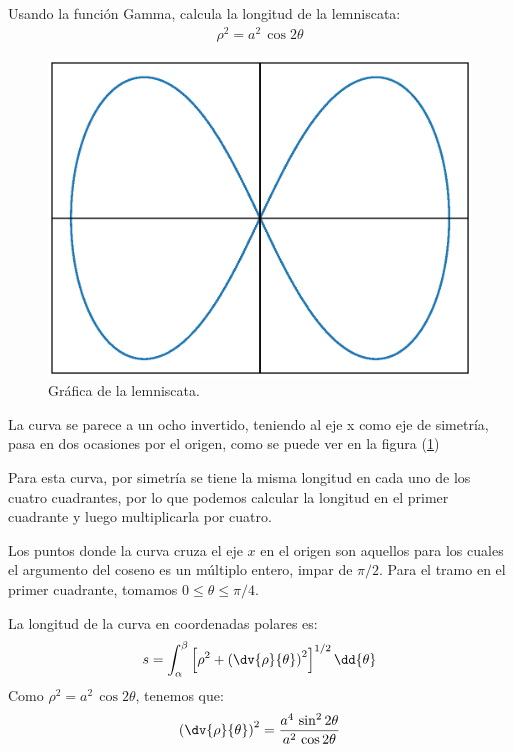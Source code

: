 Usando la función Gamma, calcula la longitud de la lemniscata:
\begin{align*}
\rho^{2} = a^{2} \, \cos 2 \theta
\end{align*}
\begin{figure}
    \centering
    \includegraphics[scale=0.54]{Imagenes/plot_leminscata_01.eps}
    \caption{Gráfica de la lemniscata.}
    \label{fig:figura_lemniscata}
\end{figure}
La curva se parece a un ocho invertido, teniendo al eje x como eje de simetría, pasa en dos ocasiones por el origen, como se puede ver en la figura (\ref{fig:figura_lemniscata})
\par
Para esta curva, por simetría se tiene la misma longitud en cada uno de los cuatro cuadrantes, por lo que podemos calcular la longitud en el primer cuadrante y luego multiplicarla por cuatro.
\par
Los puntos donde la curva cruza el eje $x$ en el origen son aquellos para los cuales el argumento del coseno es un múltiplo entero, impar de $\pi / 2$.  Para el tramo en el primer cuadrante, tomamos $0 \leq \theta \leq \pi/4$.
\par
La longitud de la curva en coordenadas polares es:
\begin{align*}
s = \int_{\alpha}^{\beta} \left[ \rho^{2} + \left( \dv{\rho}{\theta} \right)^{2} \right]^{1/2} \dd{\theta}
\end{align*}
Como $\rho^{2} = a^{2} \, \cos 2 \theta$, tenemos que:
\begin{align*}
\left( \dv{\rho}{\theta} \right)^{2} = \dfrac{a^{4} \, \sin^{2} 2 \theta}{a^{2} \, \cos 2 \theta}
\end{align*}
